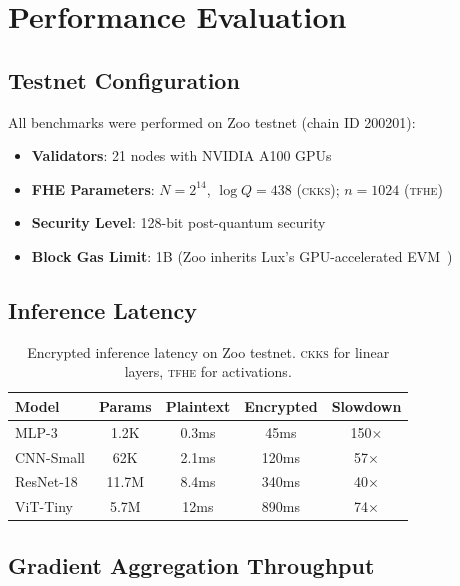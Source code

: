 \documentclass[11pt,letterpaper]{article}
\newcommand{\TFHE}{\textsc{tfhe}}
\newcommand{\CKKS}{\textsc{ckks}}
\begin{document}
\section{Performance Evaluation}
\label{sec:evaluation}

\subsection{Testnet Configuration}

All benchmarks were performed on Zoo testnet (chain ID 200201):

\begin{itemize}
    \item \textbf{Validators}: 21 nodes with NVIDIA A100 GPUs
    \item \textbf{FHE Parameters}: $N = 2^{14}$, $\log Q = 438$ (\CKKS{}); $n = 1024$ (\TFHE{})
    \item \textbf{Security Level}: 128-bit post-quantum security
    \item \textbf{Block Gas Limit}: 1B (Zoo inherits Lux's GPU-accelerated EVM~\cite{lux-evmgpu-benchmark})
\end{itemize}

\subsection{Inference Latency}

\begin{table}[t]
\centering
\begin{tabular}{lcccc}
\toprule
\textbf{Model} & \textbf{Params} & \textbf{Plaintext} & \textbf{Encrypted} & \textbf{Slowdown} \\
\midrule
MLP-3 & 1.2K & 0.3ms & 45ms & 150$\times$ \\
CNN-Small & 62K & 2.1ms & 120ms & 57$\times$ \\
ResNet-18 & 11.7M & 8.4ms & 340ms & 40$\times$ \\
ViT-Tiny & 5.7M & 12ms & 890ms & 74$\times$ \\
\bottomrule
\end{tabular}
\caption{Encrypted inference latency on Zoo testnet. \CKKS{} for linear layers, \TFHE{} for activations.}
\label{tab:inference}
\end{table}

\subsection{Gradient Aggregation Throughput}
\end{document}
